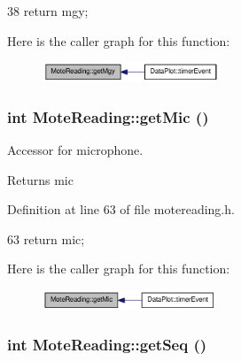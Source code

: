 \begin{DoxyCode}
38 { return mgy; }
\end{DoxyCode}




Here is the caller graph for this function:\nopagebreak
\begin{figure}[H]
\begin{center}
\leavevmode
\includegraphics[width=149pt]{classMoteReading_a4344f67449dbd79febac0c4795b185f4_icgraph}
\end{center}
\end{figure}


\hypertarget{classMoteReading_a348cb45f4613499385a354fe6857ef5d}{
\subsubsection[{getMic}]{\setlength{\rightskip}{0pt plus 5cm}int MoteReading::getMic ()}}
\label{classMoteReading_a348cb45f4613499385a354fe6857ef5d}


Accessor for microphone. 

\begin{DoxyReturn}{Returns}
mic 
\end{DoxyReturn}


Definition at line 63 of file motereading.h.




\begin{DoxyCode}
63 { return mic; }
\end{DoxyCode}




Here is the caller graph for this function:\nopagebreak
\begin{figure}[H]
\begin{center}
\leavevmode
\includegraphics[width=147pt]{classMoteReading_a348cb45f4613499385a354fe6857ef5d_icgraph}
\end{center}
\end{figure}


\hypertarget{classMoteReading_a7164d52474f2541952d44926cc79671d}{
\subsubsection[{getSeq}]{\setlength{\rightskip}{0pt plus 5cm}int MoteReading::getSeq ()}}
\label{classMoteReading_a7164d52474f2541952d44926cc79671d}


